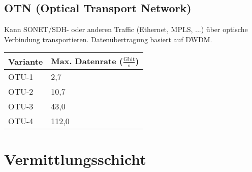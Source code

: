 \documentclass[a4paper]{article}
\begin{document}
\subsection{OTN (Optical Transport Network)}
\begin{minipage}{0.6\textwidth}
	Kann SONET/SDH- oder anderen Traffic (Ethernet, MPLS, ...) über optische Verbindung transportieren. Datenübertragung basiert auf DWDM.
\end{minipage}
\hspace{0.1\textwidth}
\begin{minipage}{0.3\textwidth}
	\begin{tabular}{|l|l|}
		\hline
		Variante & Max. Datenrate ($\frac{\text{Gbit}}{\text{s}}$)\\
		\hline
		OTU-1 & 2,7\\
		OTU-2 & 10,7\\
		OTU-3 & 43,0\\
		OTU-4 & 112,0\\
		\hline
	\end{tabular}
\end{minipage}

\section{Vermittlungsschicht}
\end{document}
